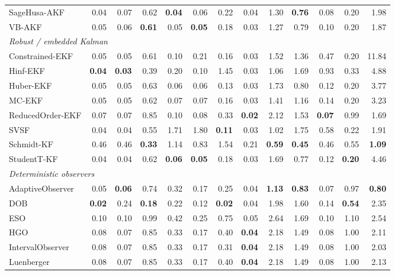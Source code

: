\begin{longtable}{lrrrrrrrrrrrr}
\quad SageHusa-AKF & 0.04 & 0.07 & 0.62 & \textbf{0.04} & 0.06 & 0.22 & 0.04 & 1.30 & \textbf{0.76} & 0.08 & 0.20 & 1.98 \\
\quad VB-AKF & 0.05 & 0.06 & \textbf{0.61} & 0.05 & \textbf{0.05} & 0.18 & 0.03 & 1.27 & 0.79 & 0.10 & 0.20 & 1.87 \\
\multicolumn{13}{l}{\textit{Robust / embedded Kalman}} \\
\quad Constrained-EKF & 0.05 & 0.05 & 0.61 & 0.10 & 0.21 & 0.16 & 0.03 & 1.52 & 1.36 & 0.47 & 0.20 & 11.84 \\
\quad Hinf-EKF & \textbf{0.04} & \textbf{0.03} & 0.39 & 0.20 & 0.10 & 1.45 & 0.03 & 1.06 & 1.69 & 0.93 & 0.33 & 4.88 \\
\quad Huber-EKF & 0.05 & 0.05 & 0.63 & 0.06 & 0.06 & 0.13 & 0.03 & 1.73 & 0.80 & 0.12 & 0.20 & 3.77 \\
\quad MC-EKF & 0.05 & 0.05 & 0.62 & 0.07 & 0.07 & 0.16 & 0.03 & 1.41 & 1.16 & 0.14 & 0.20 & 3.23 \\
\quad ReducedOrder-EKF & 0.07 & 0.07 & 0.85 & 0.10 & 0.08 & 0.33 & \textbf{0.02} & 2.12 & 1.53 & \textbf{0.07} & 0.99 & 1.69 \\
\quad SVSF & 0.04 & 0.04 & 0.55 & 1.71 & 1.80 & \textbf{0.11} & 0.03 & 1.02 & 1.75 & 0.58 & 0.22 & 1.91 \\
\quad Schmidt-KF & 0.46 & 0.46 & \textbf{0.33} & 1.14 & 0.83 & 1.54 & 0.21 & \textbf{0.59} & \textbf{0.45} & 0.46 & 0.55 & \textbf{1.09} \\
\quad StudentT-KF & 0.04 & 0.04 & 0.62 & \textbf{0.06} & \textbf{0.05} & 0.18 & 0.03 & 1.69 & 0.77 & 0.12 & \textbf{0.20} & 4.46 \\
\multicolumn{13}{l}{\textit{Deterministic observers}} \\
\quad AdaptiveObserver & 0.05 & \textbf{0.06} & 0.74 & 0.32 & 0.17 & 0.25 & 0.04 & \textbf{1.13} & \textbf{0.83} & 0.07 & 0.97 & \textbf{0.80} \\
\quad DOB & \textbf{0.02} & 0.24 & \textbf{0.18} & 0.22 & 0.12 & \textbf{0.02} & 0.04 & 1.98 & 1.60 & 0.14 & \textbf{0.54} & 2.35 \\
\quad ESO & 0.10 & 0.10 & 0.99 & 0.42 & 0.25 & 0.75 & 0.05 & 2.64 & 1.69 & 0.10 & 1.10 & 2.54 \\
\quad HGO & 0.08 & 0.07 & 0.85 & 0.33 & 0.17 & 0.40 & \textbf{0.04} & 2.18 & 1.49 & 0.08 & 1.00 & 2.11 \\
\quad IntervalObserver & 0.08 & 0.07 & 0.85 & 0.33 & 0.17 & 0.31 & \textbf{0.04} & 2.18 & 1.49 & 0.08 & 1.00 & 2.03 \\
\quad Luenberger & 0.08 & 0.07 & 0.85 & 0.33 & 0.17 & 0.40 & \textbf{0.04} & 2.18 & 1.49 & 0.08 & 1.00 & 2.13 \\

\end{longtable}
